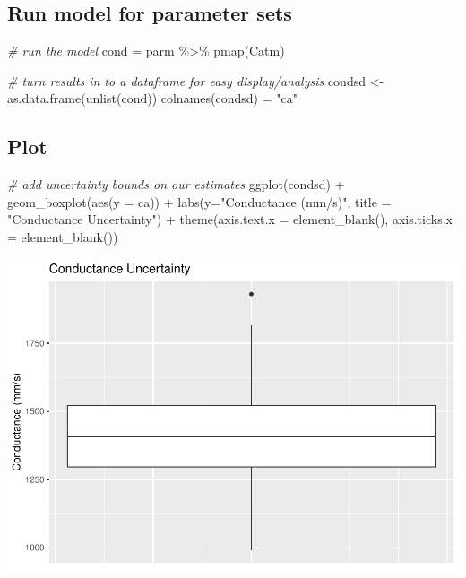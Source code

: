 \documentclass[
]{article}
\newenvironment{Shaded}{\begin{snugshade}}{\end{snugshade}}
\newcommand{\AttributeTok}[1]{\textcolor[rgb]{0.77,0.63,0.00}{#1}}
\newcommand{\CommentTok}[1]{\textcolor[rgb]{0.56,0.35,0.01}{\textit{#1}}}
\newcommand{\FunctionTok}[1]{\textcolor[rgb]{0.00,0.00,0.00}{#1}}
\newcommand{\NormalTok}[1]{#1}
\newcommand{\OtherTok}[1]{\textcolor[rgb]{0.56,0.35,0.01}{#1}}
\newcommand{\SpecialCharTok}[1]{\textcolor[rgb]{0.00,0.00,0.00}{#1}}
\newcommand{\StringTok}[1]{\textcolor[rgb]{0.31,0.60,0.02}{#1}}
\begin{document}
\hypertarget{run-model-for-parameter-sets}{%
\subsection{Run model for parameter
sets}\label{run-model-for-parameter-sets}}

\begin{Shaded}
\begin{Highlighting}[]
\CommentTok{\# run the model}
\NormalTok{cond }\OtherTok{=}\NormalTok{ parm }\SpecialCharTok{\%\textgreater{}\%} \FunctionTok{pmap}\NormalTok{(Catm)}

\CommentTok{\# turn results in to a dataframe for easy display/analysis}
\NormalTok{condsd }\OtherTok{\textless{}{-}} \FunctionTok{as.data.frame}\NormalTok{(}\FunctionTok{unlist}\NormalTok{(cond))}
\FunctionTok{colnames}\NormalTok{(condsd) }\OtherTok{=} \StringTok{"ca"}
\end{Highlighting}
\end{Shaded}

\hypertarget{plot}{%
\subsection{Plot}\label{plot}}

\begin{Shaded}
\begin{Highlighting}[]
\CommentTok{\# add uncertainty bounds on our estimates}
\FunctionTok{ggplot}\NormalTok{(condsd) }\SpecialCharTok{+}
  \FunctionTok{geom\_boxplot}\NormalTok{(}\FunctionTok{aes}\NormalTok{(}\AttributeTok{y =}\NormalTok{ ca)) }\SpecialCharTok{+}
  \FunctionTok{labs}\NormalTok{(}\AttributeTok{y=}\StringTok{"Conductance (mm/s)"}\NormalTok{,}
       \AttributeTok{title =} \StringTok{"Conductance Uncertainty"}\NormalTok{) }\SpecialCharTok{+}
  \FunctionTok{theme}\NormalTok{(}\AttributeTok{axis.text.x =} \FunctionTok{element\_blank}\NormalTok{(),}
        \AttributeTok{axis.ticks.x =} \FunctionTok{element\_blank}\NormalTok{())}
\end{Highlighting}
\end{Shaded}

\includegraphics{assignment_4_files/figure-latex/unnamed-chunk-4-1.pdf}
\end{document}

